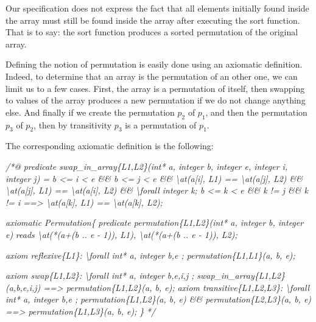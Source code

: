 \documentclass[12pt,francais,]{scrbook}
\newenvironment{Shaded}{}{}
\newcommand{\CommentTok}[1]{\textcolor[rgb]{0.38,0.63,0.69}{\textit{{#1}}}}
\begin{document}
Our specification does not express the fact that all elements initially
found inside the array must still be found inside the array after
executing the sort function. That is to say: the sort function produces
a sorted permutation of the original array.

Defining the notion of permutation is easily done using an axiomatic
definition. Indeed, to determine that an array is the permutation of an
other one, we can limit us to a few cases. First, the array is a
permutation of itself, then swapping to values of the array produces a
new permutation if we do not change anything else. And finally if we
create the permutation \(p_2\) of \(p_1\), and then the permutation
\(p_3\) of \(p_2\), then by transitivity \(p_3\) is a permutation of
\(p_1\).

The corresponding axiomatic definition is the following:

\begin{footnotesize}\begin{Shaded}
\begin{Highlighting}[]
\CommentTok{/*@}
\CommentTok{  predicate swap_in_array\{L1,L2\}(int* a, integer b, integer e, integer i, integer j) =}
\CommentTok{    b <= i < e && b <= j < e &&}
\CommentTok{    \textbackslash{}at(a[i], L1) == \textbackslash{}at(a[j], L2) && \textbackslash{}at(a[j], L1) == \textbackslash{}at(a[i], L2) &&}
\CommentTok{    \textbackslash{}forall integer k; b <= k < e && k != j && k != i ==> \textbackslash{}at(a[k], L1) == \textbackslash{}at(a[k], L2);}

\CommentTok{  axiomatic Permutation\{}
\CommentTok{    predicate permutation\{L1,L2\}(int* a, integer b, integer e)}
\CommentTok{     reads \textbackslash{}at(*(a+(b .. e - 1)), L1), \textbackslash{}at(*(a+(b .. e - 1)), L2);}

\CommentTok{    axiom reflexive\{L1\}: }
\CommentTok{      \textbackslash{}forall int* a, integer b,e ; permutation\{L1,L1\}(a, b, e);}

\CommentTok{    axiom swap\{L1,L2\}:}
\CommentTok{      \textbackslash{}forall int* a, integer b,e,i,j ;}
\CommentTok{        swap_in_array\{L1,L2\}(a,b,e,i,j) ==> permutation\{L1,L2\}(a, b, e);}
\CommentTok{    }
\CommentTok{    axiom transitive\{L1,L2,L3\}:}
\CommentTok{      \textbackslash{}forall int* a, integer b,e ; }
\CommentTok{        permutation\{L1,L2\}(a, b, e) && permutation\{L2,L3\}(a, b, e) ==> permutation\{L1,L3\}(a, b, e);}
\CommentTok{  \}}
\CommentTok{*/}
\end{Highlighting}
\end{Shaded}\end{footnotesize}
\end{document}
